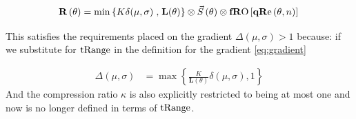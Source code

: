 \begin{equation*}
\R[\theta]   =  \min\left\{K \delta(\mu,\sigma) \right. ,  \left. \mathbf{L}(\theta) \right\} \otimes \Scale[\theta] \otimes \fRO \left[   \qRe[ \theta, n ] \right]   \\
\end{equation*}

This satisfies the requirements placed on the gradient $\Delta(\mu,\sigma)>1$ because: if we substitute for $\text{tRange}$ in the definition for the gradient \ref{eq:gradient}

\begin{equation}\label{eq:newGradient}
\begin{aligned}
\Delta(\mu,\sigma) %
&= \max\left\{ \frac{K}{\mathbf{L}(\theta)}   \delta(\mu,\sigma) , 1 \right\}
\end{aligned}
\end{equation}
And the compression ratio $\kappa$ is also explicitly restricted to being at most one and now is no longer defined in terms of $\text{tRange}$.
